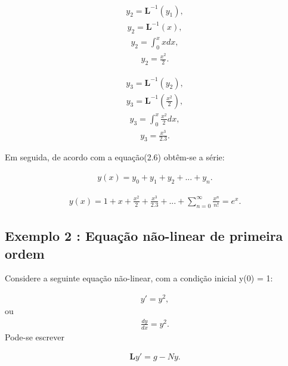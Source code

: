 \begin{gather*}
  y_{2} = \textbf{L}^{-1} (y_{1}),
\end{gather*}
\begin{gather*}
  y_{2} = \textbf{L}^{-1}(x),
\end{gather*}
\begin{gather*}
  y_{2} =\int_0^{x} xdx,
\end{gather*}
\begin{gather*}
  y_{2} = \frac{x^{2}}{2}.
\end{gather*}



\begin{gather*}
  y_{3} = \textbf{L}^{-1} (y_{2}),
\end{gather*}
\begin{gather*}
  y_{3} = \textbf{L}^{-1}\left(\frac{x^{2}}{2}\right),
\end{gather*}
\begin{gather*}
  y_{3} =\int_0^{x}\frac{x^{2}}{2}dx,
\end{gather*}
\begin{gather*}
  y_{3} = \frac{x^{3}}{2.3}.
\end{gather*}


Em seguida, de acordo com  a equação(2.6) obtêm-se a série:

\begin{gather*}
  y(x) = y_{0} +y_{1} + y_{2} + ... + y_{n} .
\end{gather*}

\begin{gather*}
  y(x) = 1 + x + \frac{x^{2}}{2} +  \frac{x^{3}}{2.3} + ...+ \sum_{n=0}^{\infty}\frac{x^{n}}{n!} = e^{x}.
\end{gather*}

\subsection{Exemplo 2 : Equação não-linear de primeira ordem}


Considere a seguinte equação não-linear, com a condição inicial y(0) = 1:

\begin{gather*}
  y' = y^{2},
\end{gather*}
ou
\begin{gather*}
 \frac{d y}{d x} = y^2.
 \end{gather*}
Pode-se escrever

\begin{gather*}
 \textbf{L}y' = g - Ny.
  \end{gather*}
  
